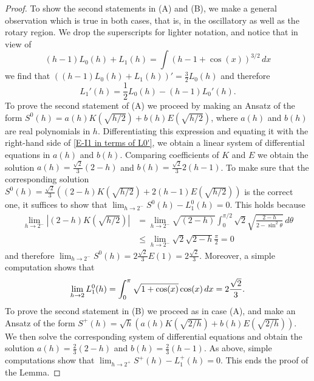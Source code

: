 \documentclass[12pt,psamsfonts]{amsart}
\begin{document}
\begin{proof}
To show the second statements in (A) and (B), we make a general
observation which is true in both cases, that is, in the oscillatory
as well as the rotary region. We drop the superscripts for lighter
notation, and notice that in view of
\begin{equation*}
    (h-1) L_0(h) + L_1(h)= \int (h-1+\cos(x))^{3/2}\, dx
\end{equation*}
we find that $((h-1) L_0(h) + L_1(h))' = \frac{3}{2} L_0(h)$ and
therefore
\begin{equation}
\label{E-I1 in terms of L0'}
    L_1'(h)=\frac{1}{2} L_0(h) - (h-1) L_0'(h).
\end{equation}
To prove the second statement of (A) we proceed by making an Ansatz of the form $S^0 (h)=a(h)
K\left(\sqrt{{h}/{2}}\right) + b(h) E\left(\sqrt{{h}/{2}}\right)$, where $a(h)$ and $b(h)$ are
real polynomials in $h$. Differentiating this expression and equating it with the right-hand side
of \eqref{E-I1 in terms of L0'}, we obtain a linear system of differential equations in $a(h)$ and
$b(h)$. Comparing coefficients of $K$ and $E$ we obtain the solution $a(h) =\frac{\sqrt{2}}{3}
(2-h)$ and $b(h) =\frac{\sqrt{2}}{3}2  (h-1)$. To make sure that the corresponding solution $S^0
(h)= \frac{\sqrt{2}}{3} \left((2-h)K\left(\sqrt{{h}/{2}}\right) + 2
(h-1)E\left(\sqrt{{h}/{2}}\right)\right)$ is the correct one, it suffices to show that $\lim_{h\to
2^-} S^0 (h)- L^0 _1(h)=0.$ This holds because
$$\begin{array}{ll}
\lim_{h\to 2^-}\left|(2-h)K\left(\sqrt{{h}/{2}}\right)\right|
        &=\lim_{h\to 2^-}\sqrt{(2-h)}\int_0^{\pi/2}\sqrt{2}\sqrt{\frac{2-h}{2-\sin^2\theta}}\,d\theta\\
        &\le \lim_{h\to 2^-}\sqrt {2}\sqrt{2-h}\frac{\pi}{2}=0
\end{array}$$
and therefore $\lim_{h\to 2^-}S^0 (h)= 2\frac{\sqrt {2}}{3}E(1) =2\frac{\sqrt {2}}{3}.$ Moreover,
a simple computation shows that
$$
   \lim_{h\to 2} L^0 _1(h)  = \int_0^{\pi} \sqrt{1+ \cos(x)}\cos(x)\, dx\\
                       = 2\frac{\sqrt {2}}{3}.
$$
To prove the second statement in (B)  we proceed as in case (A), and make an Ansatz of the form
$S^+(h)=\sqrt{h}\left(a(h) K\left(\sqrt{{2}/{h}}\right) + b(h)
E\left(\sqrt{{2}/{h}}\right)\right)$. We then solve the corresponding system of differential
equations and obtain the solution $a(h)=\frac{2}{3} (2-h)$ and $b(h)=\frac{2}{3} (h-1)$. As above,
simple computations show that $ \lim_ {h\to 2^+}S^+(h)- L^+_1(h) = 0.$ This ends the proof of the
Lemma.

\end{proof}
\end{document}
